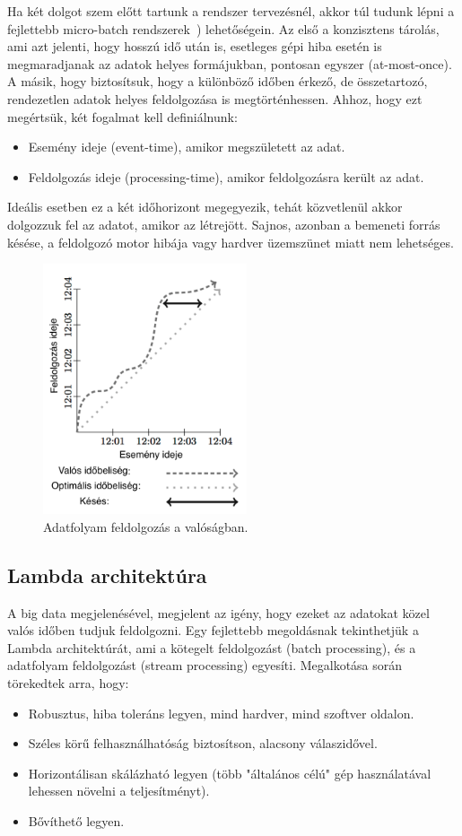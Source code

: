 \documentclass[a4paper,12pt]{article}
\begin{document}
Ha két dolgot szem előtt tartunk a rendszer tervezésnél, akkor túl tudunk lépni a fejlettebb micro-batch rendszerek~\cite{microbatch}) lehetőségein. Az első a konzisztens tárolás, ami azt jelenti, hogy hosszú idő után is, esetleges gépi hiba esetén is megmaradjanak az adatok helyes formájukban, pontosan egyszer (at-most-once). A másik, hogy biztosítsuk, hogy a különböző időben érkező, de összetartozó, rendezetlen adatok helyes feldolgozása is megtörténhessen. Ahhoz, hogy ezt megértsük, két fogalmat kell definiálnunk:
\begin{itemize}
\item Esemény ideje (event-time), amikor megszületett az adat.
\item Feldolgozás ideje (processing-time), amikor feldolgozásra került az adat.
\end{itemize}
Ideális esetben ez a két időhorizont megegyezik, tehát közvetlenül akkor dolgozzuk fel az adatot, amikor az létrejött. Sajnos, azonban a bemeneti forrás késése, a feldolgozó motor hibája vagy hardver üzemszünet miatt nem lehetséges. 
 
\begin{figure}[H]
\centering
\includegraphics[width=60mm]{img/skew.png}
\caption{Adatfolyam feldolgozás a valóságban.~\cite{skew} \label{skew}} 
\end{figure}

\subsection{Lambda architektúra}
A big data megjelenésével, megjelent az igény, hogy ezeket az adatokat közel valós időben tudjuk feldolgozni. Egy fejlettebb megoldásnak tekinthetjük a Lambda architektúrát, ami a kötegelt feldolgozást (batch processing), és a adatfolyam feldolgozást (stream processing) egyesíti. Megalkotása során törekedtek arra, hogy:
\begin{itemize}
\item Robusztus, hiba toleráns legyen, mind hardver, mind szoftver oldalon.
\item Széles körű felhasználhatóság biztosítson, alacsony válaszidővel.
\item Horizontálisan skálázható legyen (több "általános célú" gép használatával lehessen növelni a teljesítményt).
\item Bővíthető legyen.
\end{itemize}
\end{document}
